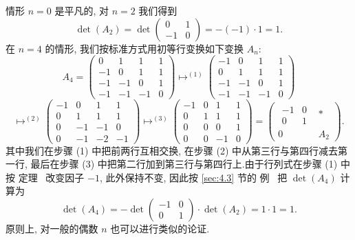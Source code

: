 情形 $n = 0$ 是平凡的, 对 $n = 2$ 我们得到
\[
\det(A_2) = \det \begin{pmatrix} 0 & 1 \\ -1 & 0 \end{pmatrix} = -(-1) \cdot 1 = 1\text{.}
\]
在 $n = 4$ 的情形, 我们按标准方式用初等行变换如下变换 $A_n$:
\[
A_4 = \begin{pmatrix} 0 & 1 & 1 & 1 \\ -1 & 0 & 1 & 1 \\ -1 & -1 & 0 & 1 \\ -1 & -1 & -1 & 0 \end{pmatrix} \longmapsto^{(1)} \begin{pmatrix} -1 & 0 & 1 & 1 \\ 0 & 1 & 1 & 1 \\ -1 & -1 & 0 & 1 \\ -1 & -1 & -1 & 0 \end{pmatrix}
\]
\[
\longmapsto^{(2)} \begin{pmatrix} -1 & 0 & 1 & 1 \\ 0 & 1 & 1 & 1 \\ 0 & -1 & -1 & 0 \\ 0 & -1 & -2 & -1 \end{pmatrix} \longmapsto^{(3)} \begin{pmatrix} -1 & 0 & 1 & 1 \\ 0 & 1 & 1 & 1 \\ 0 & 0 & 0 & 1 \\ 0 & 0 & -1 & 0 \end{pmatrix} = \begin{pmatrix} \begin{matrix} -1 & 0 \\ 0 & 1 \end{matrix} & * \\ 0 & A_2 \end{pmatrix}\text{.}
\]
其中我们在步骤 (1) 中把前两行互相交换, 在步骤 (2) 中从第三行与第四行减去第一行,
最后在步骤 (3) 中把第二行加到第三行与第四行上.由于行列式在步骤 (1) 中按
定理~ 改变因子 $-1$, 此外保持不变, 因此按 \ref{sec:4.3} 节的
例~ 把 $\det(A_4)$ 计算为
\[
\det(A_4) = -\det \begin{pmatrix} -1 & 0 \\ 0 & 1 \end{pmatrix} \cdot \det(A_2) = 1 \cdot 1 = 1\text{.}
\]
原则上, 对一般的偶数 $n$ 也可以进行类似的论证.

